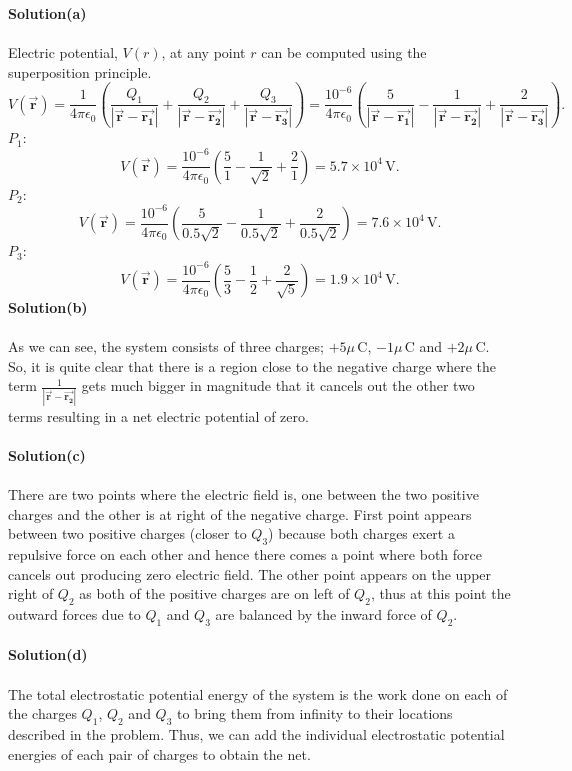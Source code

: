 \documentclass{article}
\begin{document}
\textbf{Solution(a)}
\\
\\Electric potential, $V(r)$, at any point $r$ can be computed using the superposition principle.
\[V(\boldsymbol{\Vec{r}})=\frac{1}{4\pi\epsilon_0}\left(\frac{Q_1}{|\boldsymbol{\Vec{r}}-\boldsymbol{\Vec{r_1}}|}+\frac{Q_2}{|\boldsymbol{\Vec{r}}-\boldsymbol{\Vec{r_2}}|}+\frac{Q_3}{|\boldsymbol{\Vec{r}}-\boldsymbol{\Vec{r_3}}|}\right)=\frac{10^{-6}}{4\pi\epsilon_0}\left(\frac{5}{|\boldsymbol{\Vec{r}}-\boldsymbol{\Vec{r_1}}|}-\frac{1}{|\boldsymbol{\Vec{r}}-\boldsymbol{\Vec{r_2}}|}+\frac{2}{|\boldsymbol{\Vec{r}}-\boldsymbol{\Vec{r_3}}|}\right).\]
$P_1$:
\[V(\boldsymbol{\Vec{r}})=\frac{10^{-6}}{4\pi\epsilon_0}\left(\frac{5}{1}-\frac{1}{\sqrt{2}}+\frac{2}{1}\right)=5.7\times10^4\,\text{V}.\]
$P_2$:
\[V(\boldsymbol{\Vec{r}})=\frac{10^{-6}}{4\pi\epsilon_0}\left(\frac{5}{0.5\sqrt{2}}-\frac{1}{0.5\sqrt{2}}+\frac{2}{0.5\sqrt{2}}\right)=7.6\times10^4\,\text{V}.\]
$P_3$:
\[V(\boldsymbol{\Vec{r}})=\frac{10^{-6}}{4\pi\epsilon_0}\left(\frac{5}{3}-\frac{1}{2}+\frac{2}{\sqrt{5}}\right)=1.9\times10^4\,\text{V}.\]
\textbf{Solution(b)}
\\
\\As we can see, the system consists of three charges; $+5\mu\,$C, $-1\mu\,$C and $+2\mu\,$C. So, it is quite clear that there is a region close to the negative charge where the term $\frac{1}{|\boldsymbol{\Vec{r}}-\boldsymbol{\Vec{r_2}}|}$ gets much bigger in magnitude that it cancels out the other two terms resulting in a net electric potential of zero.
\\
\\\textbf{Solution(c)}
\\
\\There are two points where the electric field is, one between the two positive charges and the other is at right of the negative charge. First point appears between two positive charges (closer to $Q_3$) because both charges exert a repulsive force on each other and hence there comes a point where both force cancels out producing zero electric field. The other point appears on the upper right of $Q_2$ as both of the positive charges are on left of $Q_2$, thus at this point the outward forces due to $Q_1$ and $Q_3$ are balanced by the inward force of $Q_2$. 
\\
\\\textbf{Solution(d)}
\\
\\The total electrostatic potential energy of the system is the work done on each of the charges $Q_1$, $Q_2$ and $Q_3$ to bring them from infinity to their locations described in the problem. Thus, we can add the individual electrostatic potential energies of each pair of charges to obtain the net.
\end{document}
